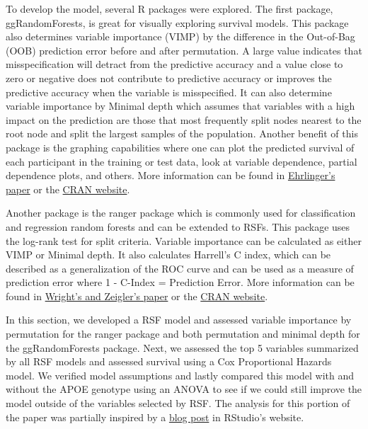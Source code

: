 \documentclass[a4paper,man,natbib,11pt]{article}
\begin{document}
To develop the model, several R packages were explored. The first package, ggRandomForests, is great for visually exploring survival models. This package also determines variable importance (VIMP) by the difference in the Out-of-Bag (OOB) prediction error before and after permutation. A large value indicates that misspecification will detract from the predictive accuracy and a value close to zero or negative does not contribute to predictive accuracy or improves the predictive accuracy when the variable is misspecified. It can also determine variable importance by Minimal depth which assumes that variables with a high impact on the prediction are those that most frequently split nodes nearest to the root node and split the largest samples of the population. Another benefit of this package is the graphing capabilities where one can plot the predicted survival of each participant in the training or test data, look at variable dependence, partial dependence plots, and others. More information can be found in \href{https://arxiv.org/pdf/1612.08974.pdf}{Ehrlinger's paper} or the \href{https://cran.r-project.org/web/packages/ggRandomForests/index.html}{CRAN website}.

Another package is the ranger package which is commonly used for classification and regression random forests and can be extended to RSFs. This package uses the log-rank test for split criteria. Variable importance can be calculated as either VIMP or Minimal depth. It also calculates Harrell's C index, which can be described as a generalization of the ROC curve and can be used as a measure of prediction error where 1 - C-Index = Prediction Error. More information can be found in \href{https://arxiv.org/pdf/1508.04409.pdf}{Wright's and Zeigler's paper} or the \href{https://cran.r-project.org/web/packages/ranger/index.html}{CRAN website}.

In this section, we developed a RSF model and assessed variable importance by permutation for the ranger package and both permutation and minimal depth for the ggRandomForests package. Next, we assessed the top 5 variables summarized by all RSF models and assessed survival using a Cox Proportional Hazards model. We verified model assumptions and lastly compared this model with and without the APOE genotype using an ANOVA to see if we could still improve the model outside of the variables selected by RSF. The analysis for this portion of the paper was partially inspired by a \href{https://rviews.rstudio.com/2017/09/25/survival-analysis-with-r/}{blog post} in RStudio's website.
\end{document}
